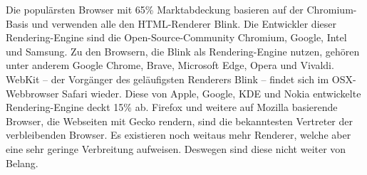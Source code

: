 Die populärsten Browser mit 65\% Marktabdeckung basieren auf der Chromium-Basis und verwenden alle den HTML-Renderer Blink. 
Die Entwickler dieser Rendering-Engine sind die Open-Source-Community Chromium, Google, Intel und Samsung.
Zu den Browsern, die Blink als Rendering-Engine nutzen, gehören unter anderem Google Chrome, Brave, Microsoft Edge, Opera und Vivaldi. 
WebKit – der Vorgänger des geläufigsten Renderers Blink – findet sich im OSX-Webbrowser Safari wieder. 
Diese von Apple, Google, KDE und Nokia entwickelte Rendering-Engine deckt 15\% ab. 
Firefox und weitere auf Mozilla basierende Browser, die Webseiten mit Gecko rendern, sind die bekanntesten Vertreter der verbleibenden Browser. 
Es existieren noch weitaus mehr Renderer, welche aber eine sehr geringe Verbreitung aufweisen. 
Deswegen sind diese nicht weiter von Belang.
